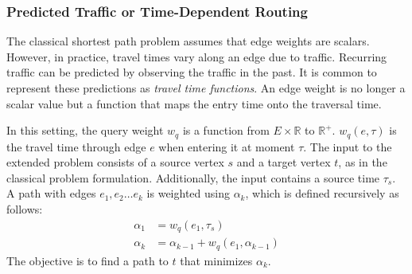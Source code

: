 \documentclass[manuscript]{acmart}
\begin{document}

\subsubsection{Predicted Traffic or Time-Dependent Routing}
\label{sec:predicted-traffic}

The classical shortest path problem assumes that edge weights are scalars.
However, in practice, travel times vary along an edge due to traffic.
Recurring traffic can be predicted by observing the traffic in the past.
It is common \cite{bgsv-mtdtt-13,bdpw-dtdrp-16,swz-sfert-21} to represent these predictions as \emph{travel time functions}.
An edge weight is no longer a scalar value but a function that maps the entry time onto the traversal time.

In this setting, the query weight $w_q$ is a function from $E\times \mathbb{R}$ to $\mathbb{R}^+$.
$w_q(e, \tau)$ is the travel time through edge $e$ when entering it at moment $\tau$.
The input to the extended problem consists of a source vertex $s$ and a target vertex $t$, as in the classical problem formulation.
Additionally, the input contains a source time $\tau_s$.
A path with edges $e_1,e_2\ldots e_k$ is weighted using $\alpha_k$, which is defined recursively as follows:\[
\begin{split}
\alpha_{1} & = w_q(e_1, \tau_s) \\
\alpha_{k} & = \alpha_{k-1} + w_q(e_1, \alpha_{k-1})
\end{split}
\]
The objective is to find a path to $t$ that minimizes $\alpha_k$.
\end{document}
